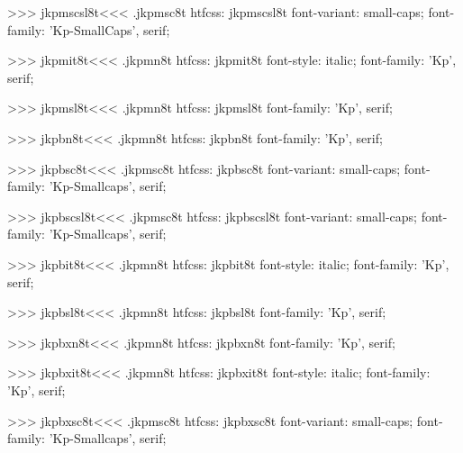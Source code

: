>>>
\<jkpmscsl8t\><<<
.jkpmsc8t
htfcss:  jkpmscsl8t  font-variant: small-caps; font-family: 'Kp-SmallCaps', serif;

>>>
\<jkpmit8t\><<<
.jkpmn8t
htfcss:  jkpmit8t  font-style: italic; font-family: 'Kp', serif;

>>>
\<jkpmsl8t\><<<
.jkpmn8t
htfcss:  jkpmsl8t  font-family: 'Kp', serif;

>>>
\<jkpbn8t\><<<
.jkpmn8t
htfcss:  jkpbn8t  font-family: 'Kp', serif;

>>>
\<jkpbsc8t\><<<
.jkpmsc8t
htfcss:  jkpbsc8t  font-variant: small-caps; font-family: 'Kp-Smallcaps', serif;

>>>
\<jkpbscsl8t\><<<
.jkpmsc8t
htfcss:  jkpbscsl8t  font-variant: small-caps; font-family: 'Kp-Smallcaps', serif;

>>>
\<jkpbit8t\><<<
.jkpmn8t
htfcss:  jkpbit8t  font-style: italic; font-family: 'Kp', serif;

>>>
\<jkpbsl8t\><<<
.jkpmn8t
htfcss:  jkpbsl8t  font-family: 'Kp', serif;

>>>
\<jkpbxn8t\><<<
.jkpmn8t
htfcss:  jkpbxn8t  font-family: 'Kp', serif;

>>>
\<jkpbxit8t\><<<
.jkpmn8t
htfcss:  jkpbxit8t  font-style: italic; font-family: 'Kp', serif;

>>>
\<jkpbxsc8t\><<<
.jkpmsc8t
htfcss:  jkpbxsc8t  font-variant: small-caps; font-family: 'Kp-Smallcaps', serif;

